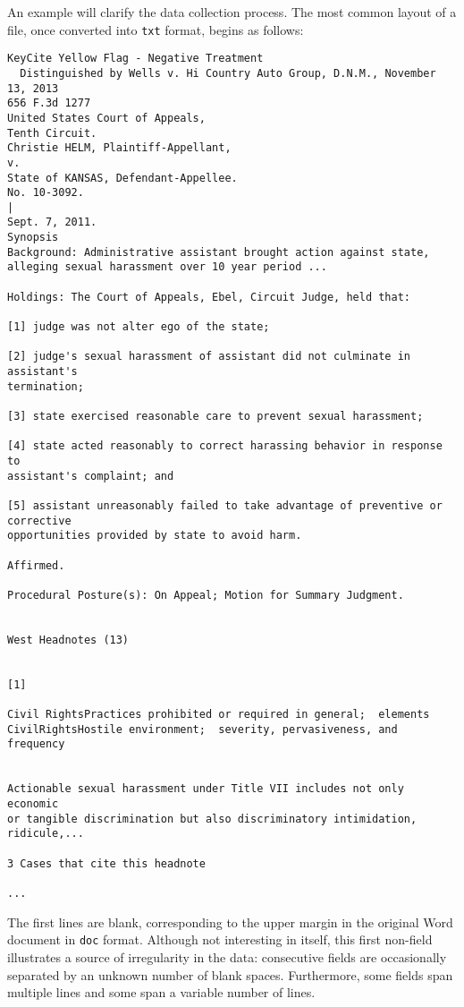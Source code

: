 \documentclass[11pt]{paper}
\begin{document}
An example will clarify the data collection process. 
The most common layout of a file, 
once converted into \texttt{txt} format, begins as follows:

\begin{verbatim}
KeyCite Yellow Flag - Negative Treatment
  Distinguished by Wells v. Hi Country Auto Group, D.N.M., November 13, 2013
656 F.3d 1277
United States Court of Appeals,
Tenth Circuit.
Christie HELM, Plaintiff-Appellant,
v.
State of KANSAS, Defendant-Appellee.
No. 10-3092.
|
Sept. 7, 2011.
Synopsis
Background: Administrative assistant brought action against state, 
alleging sexual harassment over 10 year period ...

Holdings: The Court of Appeals, Ebel, Circuit Judge, held that:
 
[1] judge was not alter ego of the state;

[2] judge's sexual harassment of assistant did not culminate in assistant's 
termination;
 
[3] state exercised reasonable care to prevent sexual harassment;
 
[4] state acted reasonably to correct harassing behavior in response to 
assistant's complaint; and
 
[5] assistant unreasonably failed to take advantage of preventive or corrective 
opportunities provided by state to avoid harm.
 
Affirmed.
 
Procedural Posture(s): On Appeal; Motion for Summary Judgment.


West Headnotes (13)


[1]

Civil RightsPractices prohibited or required in general;  elements
CivilRightsHostile environment;  severity, pervasiveness, and frequency


Actionable sexual harassment under Title VII includes not only economic 
or tangible discrimination but also discriminatory intimidation, ridicule,...

3 Cases that cite this headnote

...

\end{verbatim}

The first lines are blank, corresponding to the upper margin 
in the original Word document in \texttt{doc} format. 
Although not interesting in itself, 
this first non-field illustrates a source of irregularity in the data:
consecutive fields are occasionally separated 
by an unknown number of blank spaces. 
Furthermore, some fields span multiple lines 
and some span a variable number of lines. 
\end{document}
